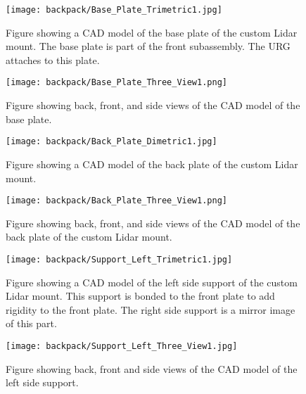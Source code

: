 \begin{figure}
\centering
\texttt{[image: backpack/Base\_Plate\_Trimetric1.jpg]}
\caption{Figure showing a CAD model of the base plate of the custom Lidar
         mount. The base plate is part of the front subassembly.
         The URG attaches to this plate.}
\label{fig:nao_lidar_mount_baseplate_trimetric1}
\end{figure}

\begin{figure}
\centering
\texttt{[image: backpack/Base\_Plate\_Three\_View1.png]}
\caption{Figure showing back, front, and side views of the CAD model of the
         base plate.}
\label{fig:nao_lidar_mount_baseplate_three_view1}
\end{figure}

\begin{figure}
\centering
\texttt{[image: backpack/Back\_Plate\_Dimetric1.jpg]}
\caption{Figure showing a CAD model of the back plate of the custom
         Lidar mount.}
\label{fig:nao_lidar_mount_backplate_dimetric1}
\end{figure}

\begin{figure}
\centering
\texttt{[image: backpack/Back\_Plate\_Three\_View1.png]}
\caption{Figure showing back, front, and side views of the CAD model of the
         back plate of the custom Lidar mount.}
\label{fig:nao_lidar_mount_backplate_three_view1}
\end{figure}



\begin{figure}
\centering
\texttt{[image: backpack/Support\_Left\_Trimetric1.jpg]}
\caption{Figure showing a CAD model of the left side support of the custom
         Lidar mount. This support is bonded to the front plate to add rigidity
         to the front plate. The right side support is a mirror image of this
         part.}
\label{fig:nao_lidar_mount_supportleft_trimetric1}
\end{figure}

\begin{figure}
\centering
\texttt{[image: backpack/Support\_Left\_Three\_View1.jpg]}
\caption{Figure showing back, front and side views of the CAD model of the left
         side support.}
\label{fig:nao_lidar_mount_supportleft_three_view1}
\end{figure}
